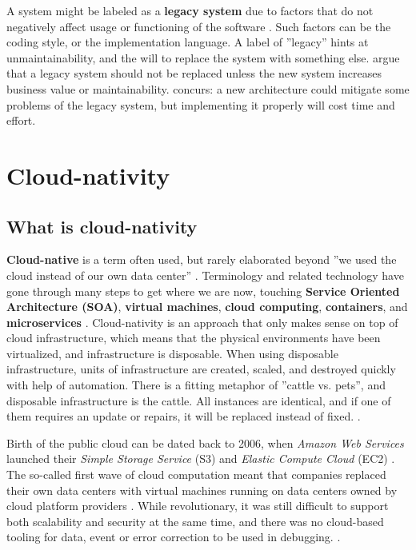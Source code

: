 \documentclass[utf8,english]{gradu3}
\begin{document}
A system might be labeled as a \textbf{legacy system} due to factors that do not
negatively affect usage or functioning of the software \parencite[22]{Broy2006}.
Such factors can be the coding style, or the implementation language. A label of
''legacy'' hints at unmaintainability, and the will to replace the system with
something else. \textcite[22]{Broy2006} argue that a legacy system should not be
replaced unless the new system increases business value or maintainability.
\textcite[18]{Li2021} concurs: a new architecture could mitigate some problems
of the legacy system, but implementing it properly will cost time and effort.


\section{Cloud-nativity}

\subsection{What is cloud-nativity}

\textbf{Cloud-native} is a term often used, but rarely elaborated beyond ''we
used the cloud instead of our own data center'' \parencite[17]{Gannon2017}.
Terminology and related technology have gone through many steps to get where we
are now, touching \textbf{Service Oriented Architecture (SOA)}, \textbf{virtual
  machines}, \textbf{cloud computing}, \textbf{containers}, and
\textbf{microservices} \parencite[3]{Kratzke2017}. Cloud-nativity is an approach
that only makes sense on top of cloud infrastructure, which means that the
physical environments have been virtualized, and infrastructure is disposable.
When using disposable infrastructure, units of infrastructure are created,
scaled, and destroyed quickly with help of automation. There is a fitting
metaphor of ''cattle vs.  pets'', and disposable infrastructure is the cattle.
All instances are identical, and if one of them requires an update or repairs,
it will be replaced instead of fixed. \parencite{Microsoft2022}.

Birth of the public cloud can be dated back to 2006, when \textit{Amazon Web Services}
launched their \textit{Simple Storage Service} (S3) and \textit{Elastic Compute Cloud} (EC2)
\parencite[1]{Kratzke2017}. The so-called first wave of cloud computation meant
that companies replaced their own data centers with virtual machines running on
data centers owned by cloud platform providers \parencite[17]{Gannon2017}. While
revolutionary, it was still difficult to support both scalability and security
at the same time, and there was no cloud-based tooling for data, event or error
correction to be used in debugging. \parencite[18]{Gannon2017}.
\end{document}
